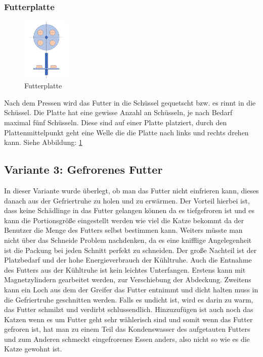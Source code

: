 \subsubsection{Futterplatte}

\begin{figure}
\vspace{-30pt}
  \begin{center}
    \includegraphics[width=0.20\textwidth]{Bilder/Powerpoint/Futterplatte}
  \end{center}
  \caption{Futterplatte}
  \label{Futterplatte}
  \vspace{-20pt}
\end{figure}


Nach dem Pressen wird das Futter in die Schüssel gequetscht bzw. es rinnt in die Schüssel. Die Platte hat eine gewisse Anzahl an Schüsseln, je nach Bedarf maximal fünf Schüsseln. Diese sind auf einer Platte platziert, durch den Plattenmittelpunkt geht eine Welle die die Platte nach links und rechts drehen kann. Siehe Abbildung: \ref{Futterplatte} \\


\subsection{Variante 3: Gefrorenes Futter}

In dieser Variante wurde überlegt, ob man das Futter nicht einfrieren kann, dieses danach aus der Gefriertruhe zu holen und zu erwärmen. Der Vorteil hierbei ist, dass keine Schädlinge in das Futter gelangen können da es tiefgefroren ist und es kann die Portionsgröße eingestellt werden wie viel die Katze bekommt da der Benutzer die Menge des Futters selbst bestimmen kann. Weiters müsste man nicht über das Schneide Problem nachdenken, da es eine knifflige Angelegenheit ist die Packung bei jeden Schnitt perfekt zu schneiden. Der große Nachteil ist der Platzbedarf und der hohe Energieverbrauch der Kühltruhe. Auch die Entnahme des Futters aus der Kühltruhe ist kein leichtes Unterfangen. Erstens kann mit Magnetzylindern gearbeitet werden, zur Verschiebung der Abdeckung. Zweitens kann ein Loch aus dem der Greifer das Futter entnimmt und dicht halten muss in die Gefriertruhe geschnitten werden. Falls es undicht ist, wird es darin zu warm, das Futter schmilzt und verdirbt schlussendlich. Hinzuzufügen ist auch noch das Katzen wenn es um Futter geht sehr wählerisch sind und somit wenn das Futter gefroren ist, hat man zu einem  Teil das Kondenswasser des aufgetauten Futters und zum Anderen schmeckt eingefrorenes Essen anders, also nicht so wie es die Katze gewohnt ist.

